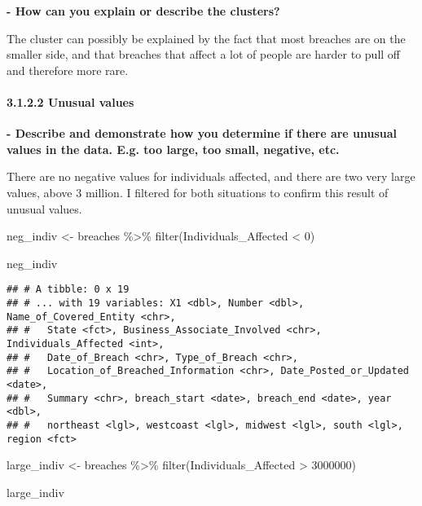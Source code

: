 \documentclass[
]{article}
\newenvironment{Shaded}{\begin{snugshade}}{\end{snugshade}}
\newcommand{\DecValTok}[1]{\textcolor[rgb]{0.00,0.00,0.81}{#1}}
\newcommand{\FunctionTok}[1]{\textcolor[rgb]{0.00,0.00,0.00}{#1}}
\newcommand{\NormalTok}[1]{#1}
\newcommand{\OtherTok}[1]{\textcolor[rgb]{0.56,0.35,0.01}{#1}}
\newcommand{\SpecialCharTok}[1]{\textcolor[rgb]{0.00,0.00,0.00}{#1}}
\begin{document}
\textbf{- How can you explain or describe the clusters?}

The cluster can possibly be explained by the fact that most breaches are
on the smaller side, and that breaches that affect a lot of people are
harder to pull off and therefore more rare.

\hypertarget{unusual-values-1}{%
\paragraph{3.1.2.2 Unusual values}\label{unusual-values-1}}

\textbf{- Describe and demonstrate how you determine if there are
unusual values in the data. E.g. too large, too small, negative, etc.}

There are no negative values for individuals affected, and there are two
very large values, above 3 million. I filtered for both situations to
confirm this result of unusual values.

\begin{Shaded}
\begin{Highlighting}[]
\NormalTok{neg\_indiv }\OtherTok{\textless{}{-}}\NormalTok{ breaches }\SpecialCharTok{\%\textgreater{}\%}
  \FunctionTok{filter}\NormalTok{(Individuals\_Affected }\SpecialCharTok{\textless{}} \DecValTok{0}\NormalTok{)}

\NormalTok{neg\_indiv}
\end{Highlighting}
\end{Shaded}

\begin{verbatim}
## # A tibble: 0 x 19
## # ... with 19 variables: X1 <dbl>, Number <dbl>, Name_of_Covered_Entity <chr>,
## #   State <fct>, Business_Associate_Involved <chr>, Individuals_Affected <int>,
## #   Date_of_Breach <chr>, Type_of_Breach <chr>,
## #   Location_of_Breached_Information <chr>, Date_Posted_or_Updated <date>,
## #   Summary <chr>, breach_start <date>, breach_end <date>, year <dbl>,
## #   northeast <lgl>, westcoast <lgl>, midwest <lgl>, south <lgl>, region <fct>
\end{verbatim}

\begin{Shaded}
\begin{Highlighting}[]
\NormalTok{large\_indiv }\OtherTok{\textless{}{-}}\NormalTok{ breaches }\SpecialCharTok{\%\textgreater{}\%}
  \FunctionTok{filter}\NormalTok{(Individuals\_Affected }\SpecialCharTok{\textgreater{}} \DecValTok{3000000}\NormalTok{)}

\NormalTok{large\_indiv}
\end{Highlighting}
\end{Shaded}
\end{document}
